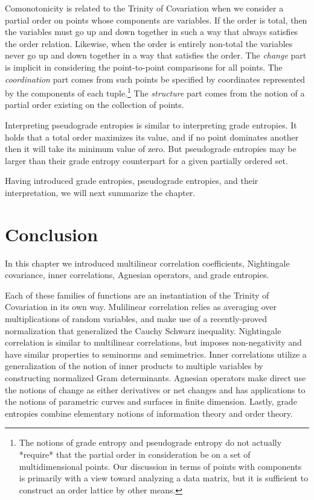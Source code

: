 \documentclass[
  letterpaper,
  DIV=11,
  numbers=noendperiod]{scrreprt}
\begin{document}
Comonotonicity is related to the Trinity of Covariation when we consider
a partial order on points whose components are variables. If the order
is total, then the variables must go up and down together in such a way
that always satisfies the order relation. Likewise, when the order is
entirely non-total the variables never go up and down together in a way
that satisfies the order. The \emph{change} part is implicit in
considering the point-to-point comparisons for all points. The
\textit{coordination} part comes from such points be specified by
coordinates represented by the components of each
tuple.\footnote{The notions of grade entropy and pseudograde entropy do not actually *require* that the partial order in consideration be on a set of multidimensional points. Our discussion in terms of points with components is primarily with a view toward analyzing a data matrix, but it is sufficient to construct an order lattice by other means.}
The \emph{structure} part comes from the notion of a partial order
existing on the collection of points.

Interpreting pseudograde entropies is similar to interpreting grade
entropies. It holds that a total order maximizes its value, and if no
point dominates another then it will take its minimum value of zero. But
pseudograde entropies may be larger than their grade entropy counterpart
for a given partially ordered set.

Having introduced grade entropies, pseudograde entropies, and their
interpretation, we will next summarize the chapter.

\section{Conclusion}\label{conclusion}

In this chapter we introduced multilinear correlation coefficients,
Nightingale covariance, inner correlations, Agnesian operators, and
grade entropies.

Each of these families of functions are an instantiation of the Trinity
of Covariation in its own way. Mulilinear correlation relies as
averaging over multiplications of random variables, and make use of a
recently-proved normalization that generalized the Cauchy Schwarz
inequality. Nightingale correlation is similar to multilinear
correlations, but imposes non-negativity and have similar properties to
seminorms and semimetrics. Inner correlations utilize a generalization
of the notion of inner products to multiple variables by constructing
normalized Gram determinants. Agnesian operators make direct use the
notions of change as either derivatives or net changes and has
applications to the notions of parametric curves and surfaces in finite
dimension. Lastly, grade entropies combine elementary notions of
information theory and order theory.
\end{document}
